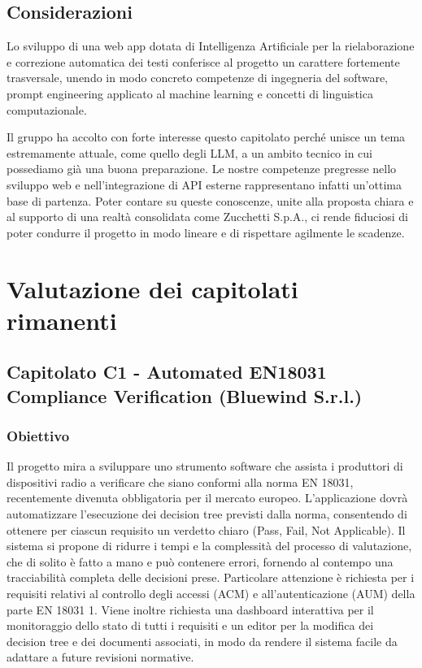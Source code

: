 \documentclass[a4paper, 10pt, colorlinks=true, linkcolor=black, urlcolor=blue, citecolor=blue, hidelinks]{article}
\begin{document}
\subsection{Considerazioni}
Lo sviluppo di una web app dotata di Intelligenza Artificiale per la rielaborazione e correzione automatica dei testi conferisce al progetto un carattere fortemente trasversale, unendo in modo concreto competenze di ingegneria del software, prompt engineering applicato al machine learning e concetti di linguistica computazionale. 

Il gruppo ha accolto con forte interesse questo capitolato perché unisce un tema estremamente attuale, come quello degli LLM, a un ambito tecnico in cui possediamo già una buona preparazione. Le nostre competenze pregresse nello sviluppo web e nell'integrazione di API esterne rappresentano infatti un'ottima base di partenza. Poter contare su queste conoscenze, unite alla proposta chiara e al supporto di una realtà consolidata come Zucchetti S.p.A., ci rende fiduciosi di poter condurre il progetto in modo lineare e di rispettare agilmente le scadenze.
\section{Valutazione dei capitolati rimanenti}
\subsection{Capitolato C1 - Automated EN18031 Compliance Verification (Bluewind S.r.l.)}

\subsubsection{Obiettivo}
Il progetto mira a sviluppare uno strumento software che assista i produttori di dispositivi radio a verificare che siano conformi alla norma EN 18031, recentemente divenuta obbligatoria per il mercato europeo. L’applicazione dovrà automatizzare l’esecuzione dei decision tree previsti dalla norma, consentendo di ottenere per ciascun requisito un verdetto chiaro (Pass, Fail, Not Applicable). Il sistema si propone di ridurre i tempi e la complessità del processo di valutazione, che di solito è fatto a mano e può contenere errori, fornendo al contempo una tracciabilità completa delle decisioni prese. Particolare attenzione è richiesta per i requisiti relativi al controllo degli accessi (ACM) e all’autenticazione (AUM) della parte EN 18031 1. Viene inoltre richiesta una dashboard interattiva per il monitoraggio dello stato di tutti i requisiti e un editor per la modifica dei decision tree e dei documenti associati, in modo da rendere il sistema facile da adattare a future revisioni normative.
\end{document}
